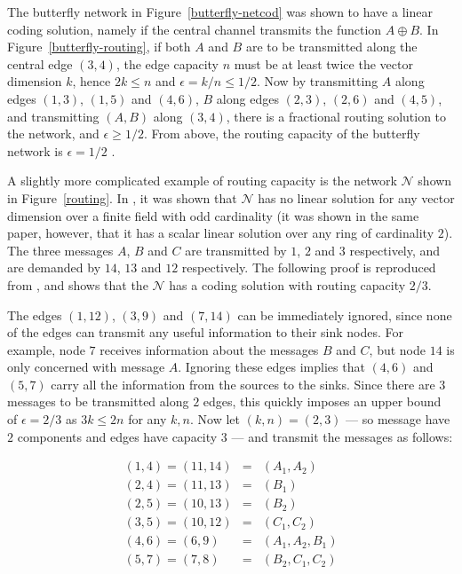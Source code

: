 The butterfly network in Figure~\ref{butterfly-netcod} was shown to have a linear coding solution, namely if the central channel transmits the function $A \oplus B$. In Figure~\ref{butterfly-routing}, if both $A$ and $B$ are to be transmitted along the central edge $(3, 4)$, the edge capacity $n$ must be at least twice the vector dimension $k$, hence $2k \leq n$ and $\epsilon = k/n \leq 1/2$. Now by transmitting $A$ along edges $(1, 3)$, $(1, 5)$ and $(4, 6)$, $B$ along edges $(2, 3)$, $(2, 6)$ and $(4, 5)$, and transmitting $(A, B)$ along $(3, 4)$, there is a fractional routing solution to the network, and $\epsilon \geq 1/2$. From above, the routing capacity of the butterfly network is $\epsilon = 1/2$ \cite{cann2006}.

A slightly more complicated example of routing capacity is the network $\mathcal{N}$ shown in Figure~\ref{routing}. In \cite{doug2005}, it was shown that $\mathcal{N}$ has no linear solution for any vector dimension over a finite field with odd cardinality (it was shown in the same paper, however, that it has a scalar linear solution over any ring of cardinality $2$). The three messages $A$, $B$ and $C$ are transmitted by $1$, $2$ and $3$ respectively, and are demanded by $14$, $13$ and $12$ respectively. The following proof is reproduced from \cite{cann2006}, and shows that the $\mathcal{N}$ has a coding solution with routing capacity $2/3$.

The edges $(1, 12)$, $(3, 9)$ and $(7, 14)$ can be immediately ignored, since none of the edges can transmit any useful information to their sink nodes. For example, node $7$ receives information about the messages $B$ and $C$, but node $14$ is only concerned with message $A$. Ignoring these edges implies that $(4, 6)$ and $(5, 7)$ carry all the information from the sources to the sinks. Since there are $3$ messages to be transmitted along $2$ edges, this quickly imposes an upper bound of $\epsilon = 2/3$ as $3k \leq 2n$ for any $k, n$. Now let $(k, n) = (2, 3)$ --- so message have $2$ components and edges have capacity $3$ --- and transmit the messages as follows:

\begin{eqnarray*}
  	(1, 4) = (11, 14) & = & (A_1, A_2) \\
  	(2, 4) = (11, 13) & = & (B_1) \\
  	(2, 5) = (10, 13) & = & (B_2) \\
  	(3, 5) = (10, 12) & = & (C_1, C_2) \\
  	(4, 6) = (6, 9)   & = & (A_1, A_2, B_1) \\
  	(5, 7) = (7, 8)   & = & (B_2, C_1, C_2)
\end{eqnarray*}

